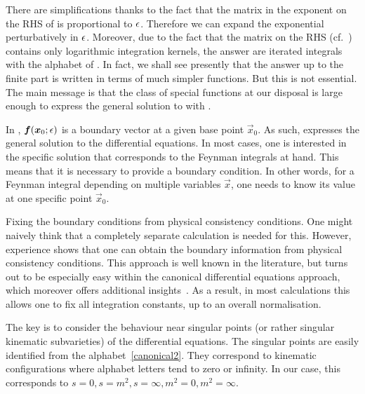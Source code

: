 There are simplifications thanks to the fact that the matrix in the exponent on the RHS of  is proportional to $\epsilon$. Therefore we can expand the exponential perturbatively in $\epsilon$. Moreover, due to the fact that the matrix on the RHS (cf.~) contains only logarithmic integration kernels, 
the answer are iterated integrals with the alphabet of .
In fact, we shall see presently that the answer up to the finite part is written in terms of much simpler functions. 
But this is not essential. The main message is that the class of special functions at our disposal is large enough to express the general solution to  with .

\smallskip
In , $\vec{f}(\vec{x}_0;\eps)$ is a boundary vector at a given base point $\vec{x}_{0}$.
As such,  expresses the general solution to the differential equations.
% 
In most cases, one is interested in the specific solution that corresponds to the Feynman integrals at hand.
This means that it is necessary to provide a boundary condition.
In other words, for a Feynman integral depending on multiple variables $\vec{x}$, one needs to know its value at one specific point $\vec{x}_{0}$.

\begin{important}{Fixing the boundary conditions from physical consistency conditions.}
One might naively think that a completely separate calculation is needed for this.
However, experience shows that one can obtain the boundary information from physical consistency conditions.
This approach is well known in the literature, but turns out to be especially easy within the canonical differential equations approach, 
which moreover offers additional insights~\cite{ch4Henn:2020lye}.
As a result, in most calculations this allows one to fix all integration constants, up to an overall normalisation.
\end{important}

The key is to consider the behaviour near singular points (or rather singular kinematic subvarieties) of the differential equations.
The singular points are  easily identified from the alphabet~\eqref{canonical2}. They correspond to kinematic configurations where alphabet letters tend to zero or infinity. In our case, this corresponds to $s=0, s=m^2, s=\infty, m^2=0, m^2 =\infty$.

